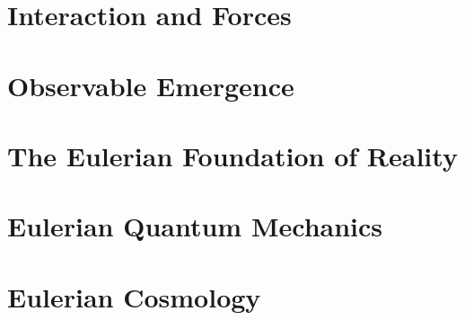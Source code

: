 \documentclass[12pt, oneside]{book}
\theoremstyle{definition}
\begin{document}
\part{Interaction and Forces}










\part{Observable Emergence}








\part{The Eulerian Foundation of Reality}







\part{Eulerian Quantum Mechanics}









\part{Eulerian Cosmology}

\appendix
% 
% 
\end{document}
